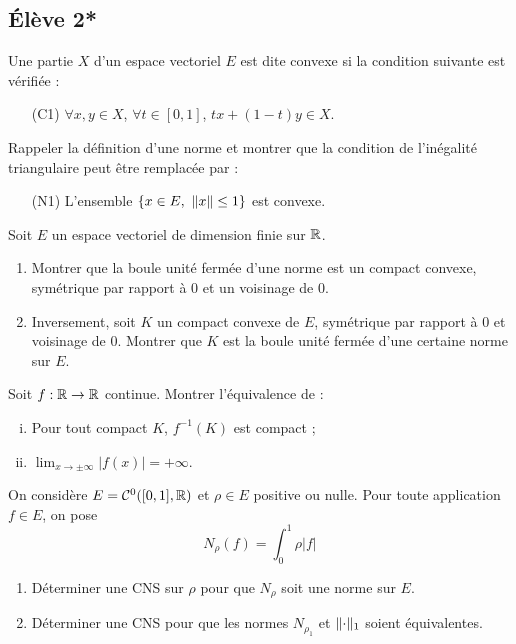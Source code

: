 \documentclass[10pt]{scrartcl}
\begin{document}
    \subsection*{Élève 2*}
    \begin{exo}
        Une partie $X$ d'un espace vectoriel $E$ est dite convexe si la condition suivante est vérifiée : 
        \begin{itemize}
            \item[(C1)] $\forall x,y\in X$, $\forall t\in[0,1]$, $tx+(1-t)y\in X$.
        \end{itemize}
        Rappeler la définition d'une norme et montrer que la condition de l'inégalité triangulaire peut être remplacée par :
        \begin{itemize}
            \item[(N1)] L'ensemble $\lbrace x\in E,\ \lVert x\rVert\leq 1\rbrace$ est convexe.
        \end{itemize}

    \end{exo}
    \begin{exo}[Jauge !] Soit $E$ un espace vectoriel de dimension finie sur $\operatorname{\mathbb R}$.
        \begin{enumerate}
            \item Montrer que la boule unité fermée d'une norme est un compact convexe, symétrique par rapport à $0$ et un voisinage de $0$.
            \item Inversement, soit $K$ un compact convexe de $E$, symétrique par rapport à $0$ et voisinage de $0$. Montrer que $K$ est la boule unité fermée d'une certaine norme sur $E$.
        \end{enumerate}
    \end{exo}

    \begin{exo}
        Soit $f:\operatorname{\mathbb R}\to\operatorname{\mathbb R}$ continue. Montrer l'équivalence de :
        \begin{enumerate}[(i)]
            \item Pour tout compact $K$, $f^{-1}(K)$ est compact ;
            \item $\lim_{x\to \pm\infty}|f(x)|=+\infty$.
        \end{enumerate}
    \end{exo}

    \begin{exo}
        On considère $E=\mathcal C^0([0,1],\operatorname{\mathbb R})$ et $\rho\in E$ positive ou nulle. Pour toute application $f\in E$, on pose 
        \[
            N_\rho(f)=\int_0^1\rho|f|
        \]
        \begin{enumerate}
            \item Déterminer une CNS sur $\rho$ pour que $N_\rho$ soit une norme sur $E$.
            \item Déterminer une CNS pour que les normes $N_{\rho_1}$ et $\lVert \cdot\rVert_1$ soient équivalentes.
        \end{enumerate}
    \end{exo}
\end{document}

